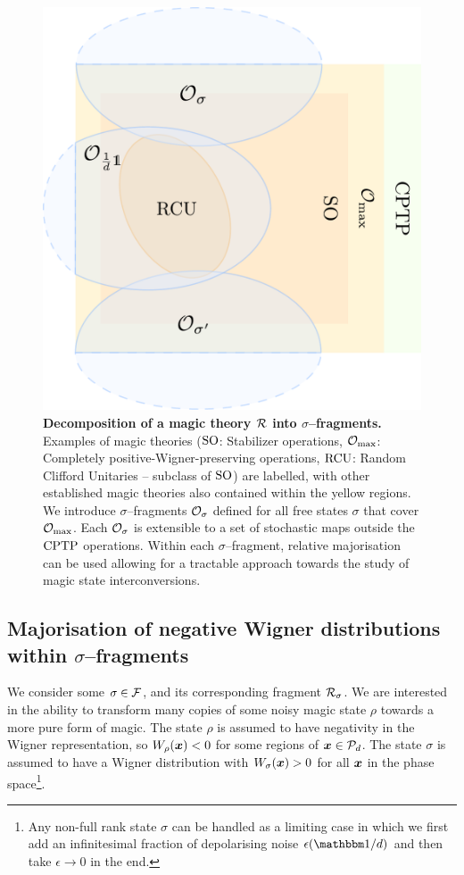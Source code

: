 \documentclass[pra,
aps,
twocolumn,
superscriptaddress,
groupedaddress,
nofootinbib,
reprint
]{revtex4-1}
\begin{document}
\begin{figure}[t]
    \centering
        \includegraphics[scale=0.3]{figs/operations.pdf}
    \caption{\textbf{Decomposition of a magic theory ${\mathcal R}$ into $\sigma$--fragments.} 
	Examples of magic theories (${\rm{SO}}$: Stabilizer operations, ${\mathcal O}_{\rm{max}}$: Completely positive-Wigner-preserving operations, ${\rm{RCU}}$: Random Clifford Unitaries -- subclass of ${\rm{SO}}$) are labelled, with other established magic theories also contained within the yellow regions.
    We introduce $\sigma$--fragments ${\mathcal O}_\sigma$ defined for all free states $\sigma$ that cover ${\mathcal O}_{\rm{max}}$. 
    Each ${\mathcal O}_\sigma$ is extensible to a set of stochastic maps outside the ${\rm{CPTP}}$ operations.
    Within each $\sigma$--fragment, relative majorisation can be used allowing for a tractable approach towards the study of magic state interconversions.
    }
    \label{fig:zoo}
\end{figure}

\subsection{Majorisation of negative Wigner distributions within $\sigma$--fragments}
\label{sec:major_frag}

We consider some $\sigma \in {\mathcal F}$, and its corresponding fragment ${\mathcal R}_\sigma$. We are interested in the ability to transform many copies of some noisy magic state $\rho$ towards a more pure form of magic. The state $\rho$ is assumed to have negativity in the Wigner representation, so $W_\rho(\boldsymbol{x}) < 0$ for some regions of $\boldsymbol{x} \in {\mathcal P}_d$. The state $\sigma$ is assumed to have a Wigner distribution with $W_\sigma(\boldsymbol{x}) > 0$ for all $\boldsymbol{x}$ in the phase space\footnote{Any non-full rank state $\sigma$ can be handled as a limiting case in which we first add an infinitesimal fraction of depolarising noise $\epsilon (\id/d)$ and then take $\epsilon \rightarrow 0$ in the end.}.
\end{document}
